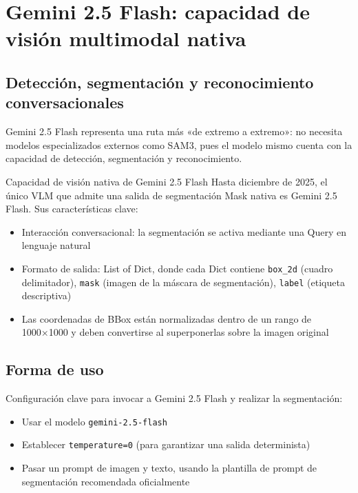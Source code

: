 \section{Gemini 2.5 Flash: capacidad de visión multimodal nativa}

\subsection{Detección, segmentación y reconocimiento conversacionales}

Gemini 2.5 Flash representa una ruta más «de extremo a extremo»: no necesita modelos especializados externos como SAM3, pues el modelo mismo cuenta con la capacidad de detección, segmentación y reconocimiento.

\begin{importantbox}{Capacidad de visión nativa de Gemini 2.5 Flash}
Hasta diciembre de 2025, el único VLM que admite una salida de segmentación Mask nativa es Gemini 2.5 Flash. Sus características clave:
\begin{itemize}
    \item Interacción conversacional: la segmentación se activa mediante una Query en lenguaje natural
    \item Formato de salida: List of Dict, donde cada Dict contiene \texttt{box\_2d} (cuadro delimitador), \texttt{mask} (imagen de la máscara de segmentación), \texttt{label} (etiqueta descriptiva)
    \item Las coordenadas de BBox están normalizadas dentro de un rango de 1000×1000 y deben convertirse al superponerlas sobre la imagen original
\end{itemize}
\end{importantbox}

\subsection{Forma de uso}

Configuración clave para invocar a Gemini 2.5 Flash y realizar la segmentación:

\begin{itemize}
    \item Usar el modelo \texttt{gemini-2.5-flash}
    \item Establecer \texttt{temperature=0} (para garantizar una salida determinista)
    \item Pasar un prompt de imagen y texto, usando la plantilla de prompt de segmentación recomendada oficialmente
\end{itemize}

